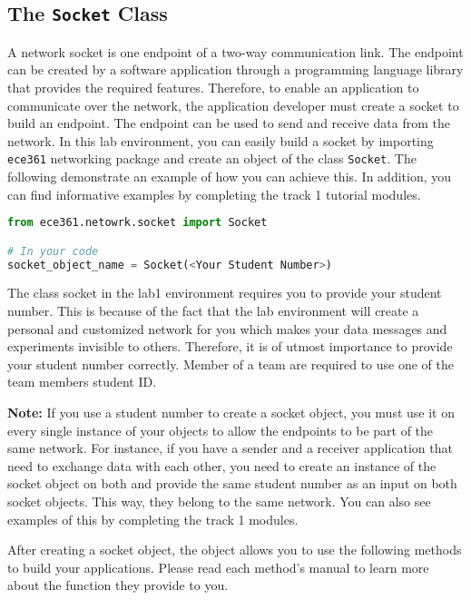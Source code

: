 \documentclass[11pt]{article}
\begin{document}
\subsection{The \texttt{Socket} Class}
\label{subsec:socket-class}
A network socket is one endpoint of a two-way communication link. The endpoint can be created by a software application through a programming language library that provides the required features. Therefore, to enable an application to communicate over the network, the application developer must create a socket to build an endpoint. The endpoint can be used to send and receive data from the network. In this lab environment, you can easily build a socket by importing \texttt{ece361} networking package and create an object of the class \texttt{Socket}. The following demonstrate an example of how you can achieve this. In addition, you can find informative examples by completing the track 1 tutorial modules.

\begin{lstlisting}[caption={Importing the \texttt{Socket} class}, language=Python]
from ece361.netowrk.socket import Socket

# In your code
socket_object_name = Socket(<Your Student Number>)
\end{lstlisting}

The class socket in the lab1 environment requires you to provide your student number. This is because of the fact that the lab environment will create a personal and customized network for you which makes your data messages and experiments invisible to others. Therefore, it is of utmost importance to provide your student number correctly. Member of a team are required to use one of the team members student ID.

\textbf{Note:}
If you use a student number to create a socket object, you must use it on every single instance of your objects to allow the endpoints to be part of the same network. For instance, if you have a sender and a receiver application that need to exchange data with each other, you need to create an instance of the socket object on both and provide the same student number as an input on both socket objects. This way, they belong to the same network. You can also see examples of this by completing the track 1 modules.

After creating a socket object, the object allows you to use the following methods to build your applications. Please read each method's manual to learn more about the function they provide to you.
\end{document}
